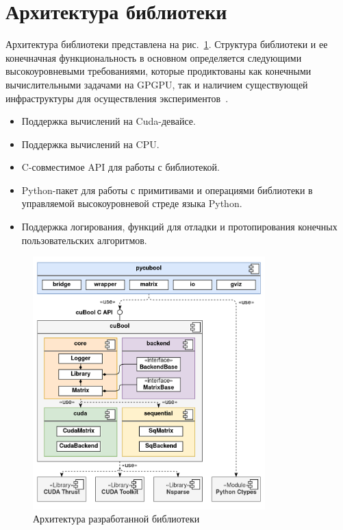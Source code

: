 \section{Архитектура библиотеки}

Архитектура библиотеки представлена на рис.~\ref{fig:cubool_architecture}.
Структура библиотеки и ее конечначная функциональность в основном определяется следующими высокоуровневыми требованиями, которые продиктованы как конечными вычислительными задачами на GPGPU, так и наличием существующей инфраструктуры для осуществления экспериментов~\cite{net:cfpq_py_algo}.

\begin{itemize}[noitemsep,topsep=0pt,parsep=0pt,partopsep=0pt]
    \item Поддержка вычислений на Cuda-девайсе.
    \item Поддержка вычислений на CPU.
    \item C-совместимое API для работы с библиотекой.
    \item Python-пакет для работы с примитивами и операциями библиотеки в управляемой высокоуровневой стреде языка Python.
    \item Поддержка логирования, функций для отладки и протопирования конечных пользовательских алгоритмов.
\end{itemize}

\begin{figure}[h]
    \centering
    \includegraphics[width=0.8\textwidth]{images/library_architecture.png}
    \caption{Архитектура разработанной библиотеки}
    \label{fig:cubool_architecture}
\end{figure}

